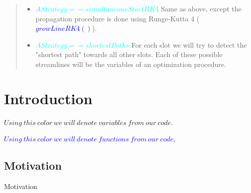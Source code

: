 \documentclass[a4paper]{report}
\begin{document}
\begin{abstract}
{\begin{itemize}
\begin{itemize}
\item the boundary
\item within a prescribed distance from the ending point of a different streamline (set as 
\textcolor{myGreen}{$thresholdStreamLineDist = 100*mean\_edge\_length*ATolerance;$})
\item the confusing ball of a different singularity (unlikely).
\end{itemize}
\item \textcolor{cyan}{$AStrategy==simultaneousStartRK4$}
\newline
Same as above, except the propagation procedure is done using Runge-Kutta 4  (\textcolor{blue}{$growLineRK4()$}).
\item \textcolor{cyan}{$AStrategy==shortestPaths$}
\newline
For each slot we will try to detect the "shortest path" towards all other slots. Each of these possible streamlines will be the variables of an optimization procedure.

\end{itemize}
 
 }
\end{abstract}




\tableofcontents{}

\setcounter{tocdepth}{4}
\newpage
\section{Introduction}

{
 \textcolor{myGreen}{$Using\ this\ color\ we\ will\ denote\ variables\ from\ our\ code.$}
 
  \textcolor{blue}{$Using\ this\ color\ we\ will\ denote\ functions\ from\ our\ code.$}
}

\bigskip
\subsection{Motivation}

{
Motivation



}
\end{document}

